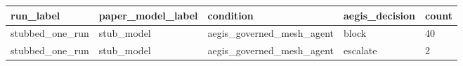 \begin{tabular}{lllll}
 \hline
run\_label & paper\_model\_label & condition & aegis\_decision & count \\
 \hline
stubbed\_one\_run & stub\_model & aegis\_governed\_mesh\_agent & block & 40 \\
stubbed\_one\_run & stub\_model & aegis\_governed\_mesh\_agent & escalate & 2 \\
 \hline
\end{tabular}

